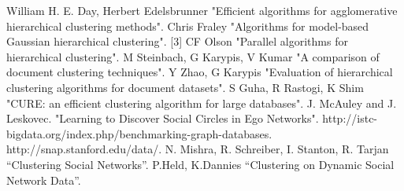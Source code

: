 \documentclass[11pt,onecolumn]{article}
\begin{document}










\begin{thebibliography}{1}
\small
 William H. E. Day, Herbert Edelsbrunner "Efficient algorithms for agglomerative hierarchical clustering methods".
Chris Fraley "Algorithms for model-based Gaussian hierarchical clustering".
[3] CF Olson "Parallel algorithms for hierarchical clustering".
M Steinbach, G Karypis, V Kumar "A comparison of document clustering techniques".
Y Zhao, G Karypis "Evaluation of hierarchical clustering algorithms for document
datasets".
S Guha, R Rastogi, K Shim "CURE: an efficient clustering algorithm for large databases".
J. McAuley and J. Leskovec. "Learning to Discover Social Circles in Ego Networks".
http://istc-bigdata.org/index.php/benchmarking-graph-databases.
 http://snap.stanford.edu/data/.
N. Mishra, R. Schreiber, I. Stanton, R. Tarjan “Clustering Social Networks”.
P.Held, K.Dannies “Clustering on Dynamic Social Network Data”.

\end{thebibliography}
\end{document}
